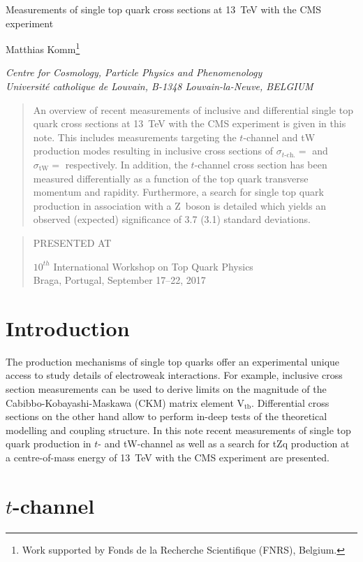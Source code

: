 \documentclass[12pt]{article}
\newcommand\pubnumber{}
\newcommand\pubdate{\today}
\def\institute{Centre for Cosmology, Particle Physics and Phenomenology\\
Universit\'e catholique de Louvain, B-1348 Louvain-la-Neuve, BELGIUM}
\def\support{\footnote{Work supported by Fonds de la Recherche Scientifique (FNRS), Belgium.}}
\def\Title#1{\begin{center} {\Large #1 } \end{center}}
\def\Author#1{\begin{center}{ \sc #1} \end{center}}
\def\Address#1{\begin{center}{ \it #1} \end{center}}
\newcommand\pubblock{\rightline{\begin{tabular}{l} \pubnumber\\
         \pubdate  \end{tabular}}}
\newenvironment{Abstract}{\begin{quotation}  }{\end{quotation}}
\newenvironment{Presented}{\begin{quotation} \begin{center} 
             PRESENTED AT\end{center}\bigskip 
      \begin{center}\begin{large}}{\end{large}\end{center} \end{quotation}}
\begin{document}
\begin{titlepage}
\pubblock

\vfill
\Title{Measurements of single top quark cross sections at 13~TeV with the CMS experiment}
\vfill
\Author{Matthias Komm\support}
\Address{\institute}
\vfill
\begin{Abstract}
An overview of recent measurements of inclusive and differential single top quark cross sections at 13~TeV with the CMS experiment is given in this note. This includes measurements targeting the $t$-channel and tW production modes resulting in inclusive cross sections of $\sigma_{t\mathrm{\mbox{-}ch.}}=$ and $\sigma_\mathrm{tW}=$ respectively. In addition, the $t$-channel cross section has been measured differentially as a function of the top quark transverse momentum and rapidity. Furthermore, a search for single top quark production in association with a Z~boson is detailed which yields an observed (expected) significance of 3.7 (3.1) standard deviations. 
\end{Abstract}
\vfill
\begin{Presented}
$10^{th}$ International Workshop on Top Quark Physics\\
Braga, Portugal,  September 17--22, 2017
\end{Presented}
\vfill
\end{titlepage}
\def\thefootnote{\fnsymbol{footnote}}
\setcounter{footnote}{0}
%

\section{Introduction}

The production mechanisms of single top quarks offer an experimental unique access to study details of electroweak interactions. For example, inclusive cross section measurements can be used to derive limits on the magnitude of the Cabibbo-Kobayashi-Maskawa (CKM) matrix element $\mathrm{V}_\mathrm{tb}$. Differential cross sections on the other hand allow to perform in-deep tests of the theoretical modelling and coupling structure. In this note recent measurements of single top quark production in $t$- and tW-channel as well as a search for tZq production at a centre-of-mass energy of 13~TeV with the CMS experiment are presented.


\section{$t$-channel}
\end{document}
